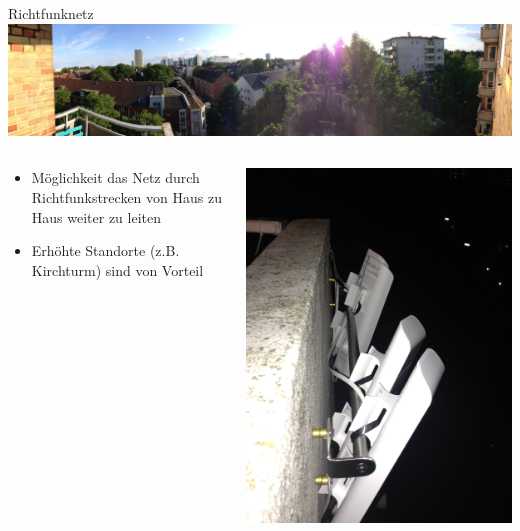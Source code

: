 \documentclass[c]{beamer}
\begin{document}
\begin{frame}{Richtfunknetz}
	\includegraphics[width=\textwidth]{Bilder/esmarch95}
	\begin{columns}
		\begin{column}{0.7\textwidth}
			\begin{itemize}
				\item Möglichkeit das Netz durch Richtfunkstrecken von Haus zu Haus weiter zu leiten
				\item Erhöhte Standorte (z.B. Kirchturm) sind von Vorteil
			\end{itemize}
		\end{column}
		\begin{column}{0.3\textwidth}
			\begin{center}
				\includegraphics[width=.8\textwidth]{Bilder/esmarch95-2}
			\end{center}
		\end{column}
	\end{columns}
	
\end{frame}
\end{document}
